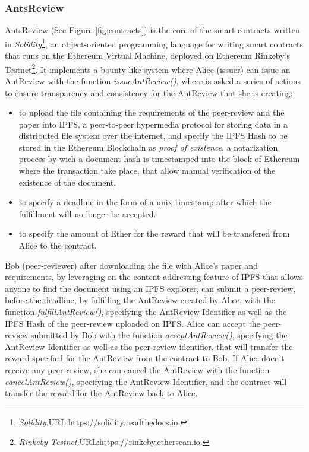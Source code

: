 \documentclass[runningheads]{llncs}
\begin{document}
\subsubsection{AntsReview}
AntsReview (See Figure \ref{fig:contracts}) is the core of the smart contracts written in \emph{Solidity}\footnote[6]{\emph{Solidity}.\textsc{URL:}https://solidity.readthedocs.io.}, an object-oriented programming language for writing smart contracts that runs on the Ethereum Virtual Machine, deployed on Ethereum Rinkeby's Testnet\footnote[7]{\emph{Rinkeby Testnet}.\textsc{URL:}https://rinkeby.etherscan.io.}. It implements a bounty-like system where Alice (issuer) can issue an AntReview with the function \emph{issueAntReview()}, where is asked a series of actions to ensure transparency and consistency for the AntReview that she is creating:
\begin{itemize}
  \item to upload the file containing the requirements of the peer-review and the paper into IPFS\cite{IPFS}, a peer-to-peer hypermedia protocol for storing data in a distributed file system over the internet, and specify the IPFS Hash to be stored in the Ethereum Blockchain as \emph{proof of existence}, a notarization process by wich a document hash is timestamped into the block of Ethereum where the transaction take place, that allow manual verification of the existence of the document.
  \item to specify a deadline in the form of a unix timestamp after which the fulfillment will no longer be accepted.
  \item to specify the amount of Ether for the reward that will be transfered from Alice to the contract.
\end{itemize}

Bob (peer-reviewer) after downloading the file with Alice's paper and requirements, by leveraging on the content-addressing feature of IPFS that allows anyone to find the document using an IPFS explorer, can submit a peer-review, before the deadline, by fulfilling the AntReview created by Alice, with the function \emph{fulfillAntReview()}, specifying the AntReview Identifier as well as the IPFS Hash of the peer-review uploaded on IPFS.
Alice can accept the peer-review submitted by Bob with the function \emph{acceptAntReview()}, specifying the AntReview Identifier as well as the peer-review identifier, that will transfer the reward specified for the AntReview from the contract to Bob.
If Alice doen't receive any peer-review, she can cancel the AntReview with the function \emph{cancelAntReview()}, specifying the AntReview Identifier, and the contract will transfer the reward for the AntReview back to Alice.
\end{document}
